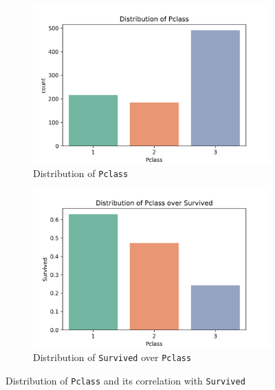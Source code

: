 \documentclass[10pt]{article}
\begin{document}
\begin{figure}[!htbp]
    \centering
    \begin{subfigure}[b]{0.49\textwidth}
        \centering
        \includegraphics[width=\textwidth]{../hw1/img/Part_II/distribution_of_pclass.png}
        \caption{Distribution of \texttt{Pclass}}
        \label{fig:pclass_distribution}
    \end{subfigure}
    \hfill
    \begin{subfigure}[b]{0.49\textwidth}
        \centering
        \includegraphics[width=\textwidth]{../hw1/img/Part_II/distribution_of_pclass_over_survived.png}
        \caption{Distribution of \texttt{Survived} over \texttt{Pclass}}
        \label{fig:pclass_vs_survived}
    \end{subfigure}
    \caption{Distribution of \texttt{Pclass} and its correlation with \texttt{Survived}}
    \label{fig:pclass}
\end{figure}
\end{document}
